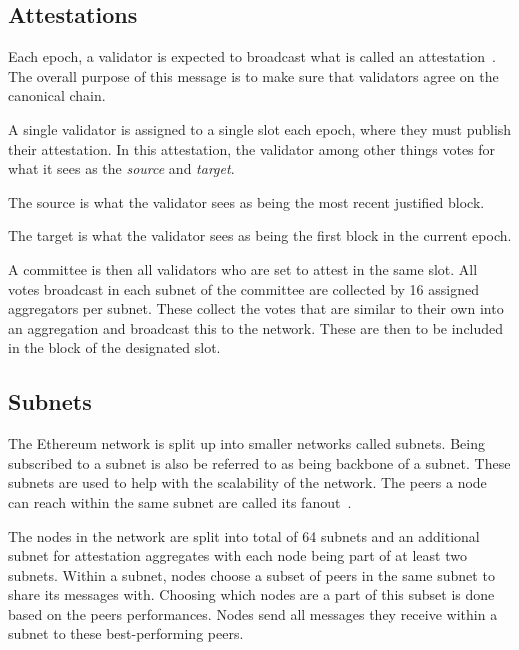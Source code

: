 \subsection{Attestations}\label{subsec:attestations}
Each epoch, a validator is expected to broadcast what is called an attestation~\cite{attestations}.
The overall purpose of this message is to make sure that validators agree on the canonical chain.

A single validator is assigned to a single slot each epoch, where they must publish their attestation.
In this attestation, the validator among other things votes for what it sees as the \textit{source} and \textit{target}.

The source is what the validator sees as being the most recent justified block.

The target is what the validator sees as being the first block in the current epoch.

A committee is then all validators who are set to attest in the same slot.
All votes broadcast in each subnet of the committee are collected by 16 assigned aggregators per subnet.
These collect the votes that are similar to their own into an aggregation and broadcast this to the network.
These are then to be included in the block of the designated slot.

\subsection{Subnets}\label{subsec:subnets}
The Ethereum network is split up into smaller networks called subnets.
Being subscribed to a subnet is also be referred to as being backbone of a subnet.
These subnets are used to help with the scalability of the network.
The peers a node can reach within the same subnet are called its fanout~\cite{heimbach2024deanonymizingethereumvalidatorsp2p}.

The nodes in the network are split into total of 64 subnets and an additional subnet for attestation aggregates with each node being part of at least two subnets.
Within a subnet, nodes choose a subset of peers in the same subnet to share its messages with.
Choosing which nodes are a part of this subset is done based on the peers performances.
Nodes send all messages they receive within a subnet to these best-performing peers.


